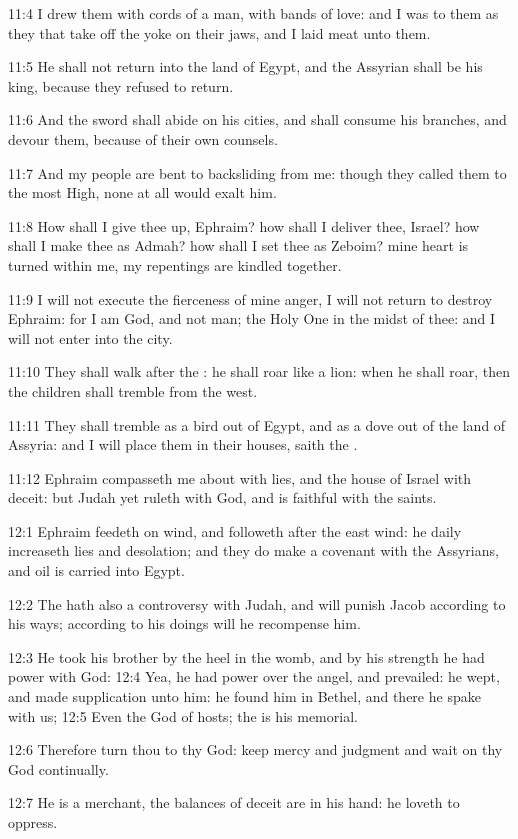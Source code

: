 11:4 I drew them with cords of a man, with bands of love: and I was to
them as they that take off the yoke on their jaws, and I laid meat
unto them.

11:5 He shall not return into the land of Egypt, and the Assyrian
shall be his king, because they refused to return.

11:6 And the sword shall abide on his cities, and shall consume his
branches, and devour them, because of their own counsels.

11:7 And my people are bent to backsliding from me: though they called
them to the most High, none at all would exalt him.

11:8 How shall I give thee up, Ephraim? how shall I deliver thee,
Israel?  how shall I make thee as Admah? how shall I set thee as
Zeboim? mine heart is turned within me, my repentings are kindled
together.

11:9 I will not execute the fierceness of mine anger, I will not
return to destroy Ephraim: for I am God, and not man; the Holy One in
the midst of thee: and I will not enter into the city.

11:10 They shall walk after the \LORD: he shall roar like a lion: when
he shall roar, then the children shall tremble from the west.

11:11 They shall tremble as a bird out of Egypt, and as a dove out of
the land of Assyria: and I will place them in their houses, saith the
\LORD.

11:12 Ephraim compasseth me about with lies, and the house of Israel
with deceit: but Judah yet ruleth with God, and is faithful with the
saints.

12:1 Ephraim feedeth on wind, and followeth after the east wind: he
daily increaseth lies and desolation; and they do make a covenant with
the Assyrians, and oil is carried into Egypt.

12:2 The \LORD hath also a controversy with Judah, and will punish
Jacob according to his ways; according to his doings will he
recompense him.

12:3 He took his brother by the heel in the womb, and by his strength
he had power with God: 12:4 Yea, he had power over the angel, and
prevailed: he wept, and made supplication unto him: he found him in
Bethel, and there he spake with us; 12:5 Even the \LORD God of hosts;
the \LORD is his memorial.

12:6 Therefore turn thou to thy God: keep mercy and judgment and wait
on thy God continually.

12:7 He is a merchant, the balances of deceit are in his hand: he
loveth to oppress.

